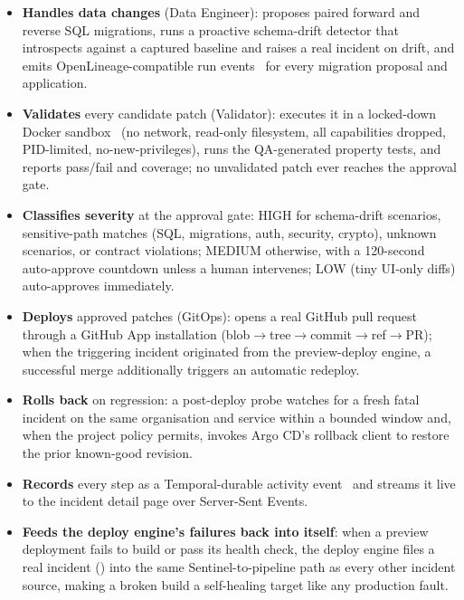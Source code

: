 \begin{itemize}[nosep]
        monitoring.
  \item \textbf{Handles data changes} (Data Engineer): proposes paired
        forward and reverse SQL migrations, runs a proactive schema-drift
        detector that introspects  against a
        captured baseline and raises a real incident on drift, and emits
        OpenLineage-compatible run events~\cite{openlineage} for every
        migration proposal and application.
  \item \textbf{Validates} every candidate patch (Validator): executes it in
        a locked-down Docker sandbox~\cite{docker} (no network, read-only
        filesystem, all capabilities dropped, PID-limited,
        no-new-privileges), runs the QA-generated property tests, and reports
        pass/fail and coverage; no unvalidated patch ever reaches the
        approval gate.
  \item \textbf{Classifies severity} at the approval gate: HIGH for
        schema-drift scenarios, sensitive-path matches (SQL, migrations,
        auth, security, crypto), unknown scenarios, or contract violations;
        MEDIUM otherwise, with a 120-second auto-approve countdown unless a
        human intervenes; LOW (tiny UI-only diffs) auto-approves immediately.
  \item \textbf{Deploys} approved patches (GitOps): opens a real GitHub pull
        request through a GitHub App installation
        (blob$\rightarrow$tree$\rightarrow$commit$\rightarrow$ref$\rightarrow$PR);
        when the triggering incident originated from the preview-deploy
        engine, a successful merge additionally triggers an automatic
        redeploy.
  \item \textbf{Rolls back} on regression: a post-deploy probe watches for a
        fresh fatal incident on the same organisation and service within a
        bounded window and, when the project policy permits, invokes Argo
        CD's rollback client to restore the prior known-good revision.
  \item \textbf{Records} every step as a Temporal-durable activity
        event~\cite{temporal} and streams it live to the incident detail
        page over Server-Sent Events.
  \item \textbf{Feeds the deploy engine's failures back into itself}: when a
        preview deployment fails to build or pass its health check, the
        deploy engine files a real incident () into the same Sentinel-to-pipeline path as every
        other incident source, making a broken build a self-healing target
        like any production fault.
\end{itemize}


